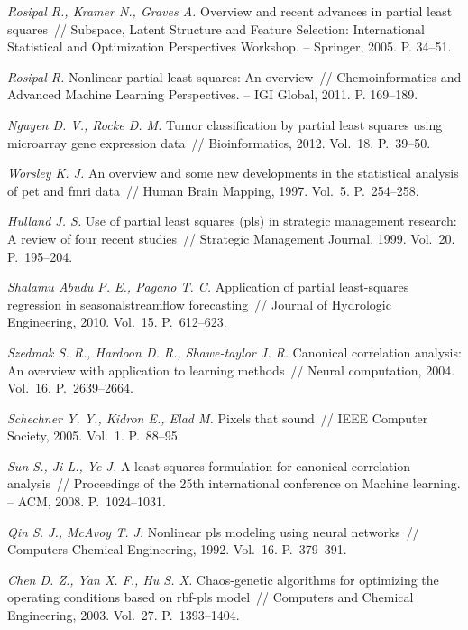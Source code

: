 \documentclass[12pt]{article}
\begin{document}

\begin{thebibliography}{99}

\textit{Rosipal R., Kramer N., Graves A.} Overview and recent advances in partial least squares~// Subspace, Latent Structure and Feature Selection: International Statistical and Optimization Perspectives Workshop. -- Springer, 2005. P. 34--51.

\textit{Rosipal R.} Nonlinear partial least squares: An overview~// Chemoinformatics and Advanced Machine Learning Perspectives. -- IGI Global, 2011. P. 169--189.

\textit{Nguyen D. V., Rocke D. M.} Tumor classification by partial least squares using microarray gene expression data~// Bioinformatics, 2012.  Vol.~18. P.~39--50. 

\textit{Worsley K. J.} An overview and some new developments in the statistical analysis of pet and fmri data~// Human Brain Mapping, 1997. Vol.~5. P.~254--258.

\textit{Hulland J. S.} Use of partial least squares (pls) in strategic management research: A review of four recent studies~// Strategic Management Journal, 1999. Vol.~20. P.~195--204.

\textit{Shalamu Abudu P. E., Pagano T. C.} Application of partial least-squares regression in seasonalstreamflow forecasting~// Journal of Hydrologic Engineering, 2010. Vol.~15. P.~612--623.

\textit{Szedmak S. R., Hardoon D. R., Shawe-taylor J. R.} Canonical correlation analysis: An overview with application to learning methods~// Neural computation, 2004. Vol.~16. P.~2639--2664.

\textit{Schechner Y. Y., Kidron E., Elad M.} Pixels that sound~// IEEE Computer Society, 2005. Vol.~1. P.~88--95.

\textit{Sun S., Ji L., Ye J.} A least squares formulation for canonical correlation analysis~// Proceedings of the 25th international conference on Machine learning. -- ACM, 2008. P.~1024--1031.

\textit{Qin S. J., McAvoy T. J.} Nonlinear pls modeling using neural networks~// Computers Chemical Engineering, 1992. Vol.~16. P.~379--391.

\textit{Chen D. Z., Yan X. F., Hu S. X.} Chaos-genetic algorithms for optimizing the operating conditions based on rbf-pls model~// Computers and Chemical Engineering, 2003. Vol.~27. P.~1393--1404.


\end{thebibliography}
\end{document}
